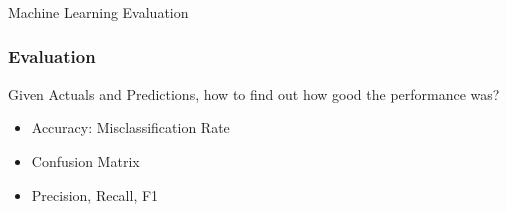 %
%
%

\begin{frame}[fragile]\frametitle{}
\begin{center}
{\Large Machine Learning Evaluation}
\end{center}
\end{frame}

\begin{frame}[fragile]\frametitle{Evaluation}
Given Actuals and Predictions, how to find out how good the performance was?
\begin{itemize}
\item Accuracy: Misclassification Rate
\item Confusion Matrix
\item Precision, Recall, F1
\end{itemize}
\end{frame}

